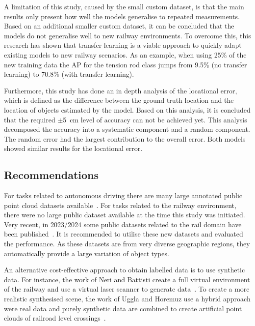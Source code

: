 A limitation of this study, caused by the small custom dataset, is that the main results only present how well the models generalise to repeated measurements. Based on an additional smaller custom dataset, it can be concluded that the models do not generalise well to new railway environments. To overcome this, this research has shown that transfer learning is a viable approach to quickly adapt existing models to new railway scenarios. As an example, when using 25\% of the new training data the AP for the tension rod class jumps from 9.5\% (no transfer learning) to 70.8\% (with transfer learning).

Furthermore, this study has done an in depth analysis of the locational error, which is defined as the difference between the ground truth location and the location of objects estimated by the model. Based on this analysis, it is concluded that the required $\pm$5~cm level of accuracy can not be achieved yet. This analysis decomposed the accuracy into a systematic component and a random component. The random error had the largest contribution to the overall error. Both models showed similar results for the locational error.



\subsection{Recommendations}
For tasks related to autonomous driving there are many large annotated public point cloud datasets available~\cite{YinBerger17}. For tasks related to the railway environment, there were no large public dataset available at the time this study was initiated. Very recent, in 2023/2024 some public datasets related to the rail domain have been published~\cite{dataKharroubi,osdar23,whuRail3D}. It is recommended to utilise these new datasets and evaluated the performance. As these datasets are from very diverse geographic regions, they automatically provide a large variation of object types.

An alternative cost-effective approach to obtain labelled data is to use synthetic data. For instance, the work of Neri and Battisti create a full virtual environment of the railway and use a virtual laser scanner to generate data~\cite{Neri22}. To create a more realistic synthesised scene, the work of Uggla and Horemuz use a hybrid approach were real data and purely synthetic data are combined to create artificial point clouds of railroad level crossings~\cite{uggla2021towards}.

